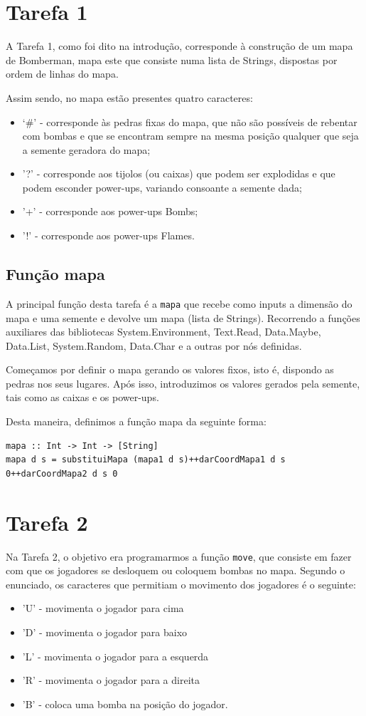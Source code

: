 \documentclass[a4paper]{article}
\begin{document}
\section{Tarefa 1}
\label{t1}
A Tarefa 1, como foi dito na introdução, corresponde à construção de um mapa de Bomberman, mapa este que consiste numa lista de Strings, dispostas por ordem de linhas do mapa. 

Assim sendo, no mapa estão presentes quatro caracteres: 
\begin{itemize}
\item ‘\#’ - corresponde às pedras fixas do mapa, que não são possíveis de rebentar com bombas e que se encontram sempre na mesma posição qualquer que seja a semente geradora do mapa;
 \item '?' - corresponde aos tijolos (ou caixas) que podem ser explodidas e que podem esconder power-ups, variando consoante a semente dada;
 \item '+' - corresponde aos power-ups Bombs;
 \item '!' - corresponde aos power-ups Flames.
\end{itemize}

\subsection{Função mapa}
A principal função desta tarefa é a \texttt{mapa} que recebe como inputs a dimensão do mapa e uma semente e devolve um mapa (lista de Strings).
Recorrendo a funções auxiliares das bibliotecas System.Environment, Text.Read, Data.Maybe, Data.List, System.Random, Data.Char e a outras por nós definidas. 

Começamos por definir o mapa gerando os valores fixos, isto é, dispondo as pedras nos seus lugares. Após isso, introduzimos os valores gerados pela semente, tais como as caixas e os power-ups.

Desta maneira, definimos a função mapa da seguinte forma:
\begin{verbatim}
mapa :: Int -> Int -> [String]
mapa d s = substituiMapa (mapa1 d s)++darCoordMapa1 d s 0++darCoordMapa2 d s 0
\end{verbatim}

\section{Tarefa 2}
\label{t2}
Na Tarefa 2, o objetivo era programarmos a função \texttt{move}, que consiste em fazer com que os jogadores se desloquem ou coloquem bombas no mapa. Segundo o enunciado, os caracteres que permitiam o movimento dos jogadores é o seguinte:
\begin{itemize}
\item 'U' - movimenta o jogador para cima
\item 'D' - movimenta o jogador para baixo
\item 'L' - movimenta o jogador para a esquerda
\item 'R' - movimenta o jogador para a direita
\item 'B' - coloca uma bomba na posição do jogador.
\end{itemize}
\end{document}
